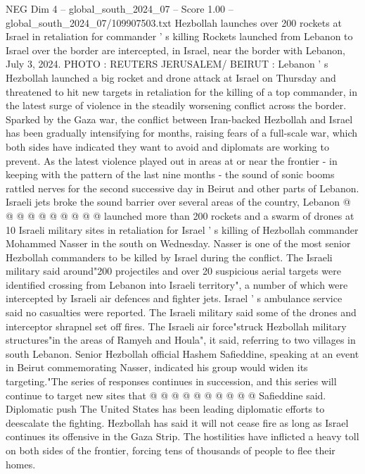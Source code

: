 \begin{textsample}{NEG Dim 4 – global\_south\_2024\_07 – Score 1.00 – global\_south\_2024\_07/109907503.txt}  \label{ex:f4_neg_347}
Hezbollah launches over 200 rockets at Israel in retaliation for commander ' s killing Rockets launched from Lebanon to Israel over the border are intercepted, in Israel, near the border with Lebanon, July 3, 2024.
PHOTO : REUTERS JERUSALEM/ BEIRUT : Lebanon ' s Hezbollah launched a big rocket and drone attack at Israel on Thursday and threatened to hit new targets in retaliation for the killing of a top commander, in the latest surge of violence in the steadily worsening conflict across the border.
Sparked by the Gaza war, the conflict between Iran-backed Hezbollah and Israel has been gradually intensifying for months, raising fears of a full-scale war, which both sides have indicated they want to avoid and diplomats are working to prevent.
As the latest violence played out in areas at or near the frontier - in keeping with the pattern of the last nine months - the sound of sonic booms rattled nerves for the second successive day in Beirut and other parts of Lebanon.
Israeli jets broke the sound barrier over several areas of the country, Lebanon @ @ @ @ @ @ @ @ @ @ launched more than 200 rockets and a swarm of drones at 10 Israeli military sites in retaliation for Israel ' s killing of Hezbollah commander Mohammed Nasser in the south on Wednesday.
Nasser is one of the most senior Hezbollah commanders to be killed by Israel during the conflict.
The Israeli military said around"200 projectiles and over 20 suspicious aerial targets were identified crossing from Lebanon into Israeli territory", a number of which were intercepted by Israeli air defences and fighter jets.
Israel ' s ambulance service said no casualties were reported.
The Israeli military said some of the drones and interceptor shrapnel set off fires.
The Israeli air force"struck Hezbollah military structures"in the areas of Ramyeh and Houla", it said, referring to two villages in south Lebanon.
Senior Hezbollah official Hashem Safieddine, speaking at an event in Beirut commemorating Nasser, indicated his group would widen its targeting."The series of responses continues in succession, and this series will continue to target new sites that @ @ @ @ @ @ @ @ @ @ Safieddine said.
Diplomatic push The United States has been leading diplomatic efforts to deescalate the fighting.
Hezbollah has said it will not cease fire as long as Israel continues its offensive in the Gaza Strip.
The hostilities have inflicted a heavy toll on both sides of the frontier, forcing tens of thousands of people to flee their homes.

\end{textsample}
